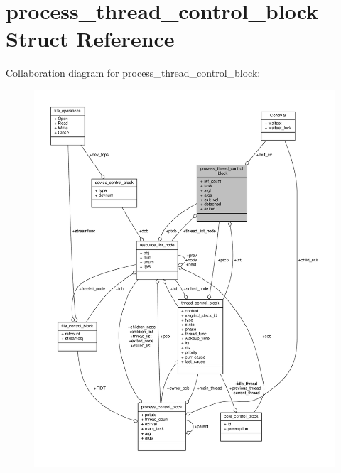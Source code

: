 \hypertarget{structprocess__thread__control__block}{}\section{process\+\_\+thread\+\_\+control\+\_\+block Struct Reference}
\label{structprocess__thread__control__block}


Collaboration diagram for process\+\_\+thread\+\_\+control\+\_\+block\+:
\nopagebreak
\begin{figure}[H]
\begin{center}
\leavevmode
\includegraphics[width=350pt]{structprocess__thread__control__block__coll__graph}
\end{center}
\end{figure}
